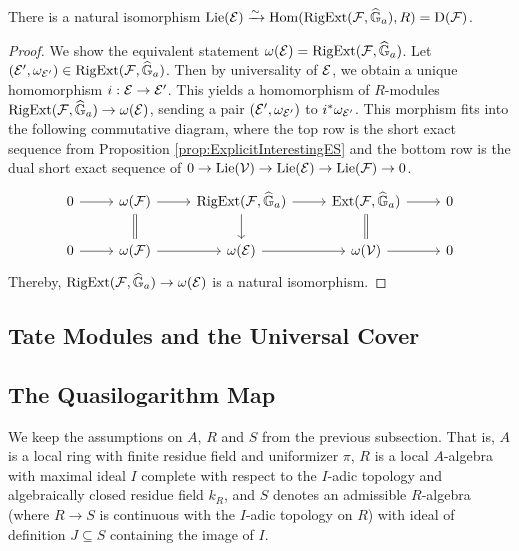 \documentclass[../main.tex]{subfiles}
\begin{document}
\begin{lem}\label{lem:LieAlgOfUnivAddExt}
  There is a natural isomorphism $\operatorname{Lie}(\mathcal{E}) \xrightarrow{\sim} \operatorname{Hom}(\operatorname {RigExt}(\mathcal{F}, \widehat{\mathbb{G}}_a), R) 
  = \mathrm{D}(\mathcal{F})$.
\begin{proof}
  We show the equivalent statement $\omega(\mathcal{E}) = \operatorname {RigExt}(\mathcal{F}, \widehat{\mathbb{G}}_a)$. 
  Let $(\mathcal{E}', \omega_{\mathcal{E}'}) \in \operatorname {RigExt}(\mathcal{F}, \widehat{\mathbb{G}}_a)$. Then by universality of 
  $\mathcal{E}$, we obtain a unique homomorphism $i: \mathcal{E} \to \mathcal{E}'$. This yields a 
  homomorphism of $R$-modules $\operatorname {RigExt}(\mathcal{F}, \widehat{\mathbb{G}}_a) \to \omega(\mathcal{E})$, 
  sending a pair $(\mathcal{E}', \omega_{\mathcal{E}'})$ to $i^*\omega_{\mathcal{E}'}$. This morphism
  fits into the following commutative diagram, where the top row is 
  the short exact sequence from Proposition \ref{prop:ExplicitInterestingES}
  and the bottom row is the dual short exact sequence of 
  $0 \to \operatorname{Lie}(\mathcal{V}) \to \operatorname{Lie}(\mathcal{E}) \to \operatorname{Lie}(\mathcal{F}) \to 0$.
  \begin{equation*}
  \begin{tikzcd}[ampersand replacement=\&]
  	0 \& {\omega(\cF)} \& {\RigExt(\cF, \GG_a)} \& {\Ext(\cF, \GG_a)} \& 0 \\
  	0 \& {\omega(\cF)} \& {\omega(\cE)} \& {\omega(\cV)} \& 0
  	\arrow[from=1-1, to=1-2]
  	\arrow[from=1-2, to=1-3]
  	\arrow[Rightarrow, no head, from=1-2, to=2-2]
  	\arrow[from=1-3, to=1-4]
  	\arrow[from=1-3, to=2-3]
  	\arrow[from=1-4, to=1-5]
  	\arrow[Rightarrow, no head, from=1-4, to=2-4]
  	\arrow[from=2-1, to=2-2]
  	\arrow[from=2-2, to=2-3]
  	\arrow[from=2-3, to=2-4]
  	\arrow[from=2-4, to=2-5]
  \end{tikzcd}
  \end{equation*}
  Thereby, $\operatorname {RigExt}(\mathcal{F}, \widehat{\mathbb{G}}_a) \to \omega(\mathcal{E})$ is a natural isomorphism.
\end{proof}
\end{lem}

\subsection{Tate Modules and the Universal Cover} %
\label{sub:Tate Modules and the Universal Cover}


\subsection{The Quasilogarithm Map} %
\label{sub:The Quasilogarithm map}
We keep the assumptions on $A$, $R$ and $S$ from the previous subsection. That is,
$A$ is a local ring with finite residue field and uniformizer $\pi$, 
$R$ is a local $A$-algebra with maximal ideal $I$ complete with respect to
the $I$-adic topology and algebraically closed residue field $k_R$, and 
$S$ denotes an admissible $R$-algebra (where $R \to S$ is continuous with
the $I$-adic topology on $R$) with ideal of definition $J \subseteq S$ containing
the image of $I$. 
\end{document}
